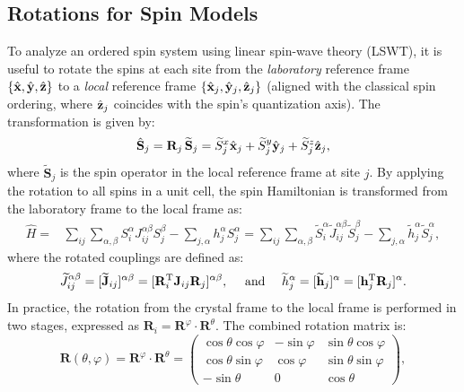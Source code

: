 \subsection{Rotations for Spin Models}
To analyze an ordered spin system using linear spin-wave theory (LSWT), it is useful to rotate the spins at each site from the \emph{laboratory} reference frame $\{\hat{\bf x}, \hat{\bf y}, \hat{\bf z}\}$ to a \emph{local} reference frame $\{\hat{\bf x}_{j}, \hat{\bf y}_{j}, \hat{\bf z}_{j}\}$ (aligned with the classical spin ordering, where $\hat{{\bf z}}_{j}$ coincides with the spin's quantization axis). 
The transformation is given by:
\begin{equation}
    \label{eq: Spin rotation}
    \hat{\bf S}_j = \mathbf{R}_j \, \widetilde{\mathbf{S}}_j 
    = \widetilde{S}^{x}_{j} \hat{\bf x}_{j} + \widetilde{S}^{y}_{j} \hat{\bf y}_{j} + \widetilde{S}^{z}_{j} \hat{\bf z}_{j},
\end{equation}
where $\widetilde{\mathbf{S}}_j$ is the spin operator in the local reference frame at site $j$.
By applying the rotation to all spins in a unit cell, the spin Hamiltonian is transformed from the laboratory frame to the local frame as:
\begin{equation}\label{eq: Rotated Hamiltonian}
    \begin{split}
        \hat{H} = & \sum_{ij} \sum_{\alpha, \beta} S^{\alpha}_{i} J_{ij}^{\alpha\beta} S^{\beta}_{j} - \sum_{j, \alpha} h_{j}^{\alpha} S^{\alpha}_{j}
        = \sum_{ij} \sum_{\alpha, \beta} \widetilde{S}^{\alpha}_{i} \widetilde{J}_{ij}^{\alpha\beta} \widetilde{S}^{\beta}_{j} - \sum_{j, \alpha} \widetilde{h}_{j}^{\alpha} \widetilde{S}^{\alpha}_{j},
    \end{split}
\end{equation}
where the rotated couplings are defined as:
\begin{equation}
    \widetilde{J}_{ij}^{\alpha\beta}  = [\widetilde{\mathbf{J}}_{ij}]^{\alpha\beta} = [\mathbf{R}_i^{\rm T} \mathbf{J}_{ij} \mathbf{R}_j]^{\alpha\beta}, 
    \quad \text{ and } \quad
     \widetilde{h}_{j}^{\alpha} = [\widetilde{\mathbf{h}}_j]^{\alpha} = [\mathbf{h}_{j}^{\rm T} \mathbf{R}_{j}]^{\alpha}.
\end{equation}
In practice, the rotation from the crystal frame to the local frame is performed in two stages, expressed as $\mathbf{R}_i = \mathbf{R}^{\varphi} \cdot \mathbf{R}^{\theta}$. The combined rotation matrix is:
\begin{equation}
    \mathbf{R} (\theta, \varphi) = \mathbf{R}^{\varphi} \cdot \mathbf{R}^{\theta} = 
    \begin{pmatrix} 
        \cos \theta \cos \varphi & -\sin \varphi & \sin \theta \cos \varphi \\
        \cos \theta \sin \varphi & \cos \varphi & \sin \theta \sin \varphi \\
        -\sin \theta & 0 & \cos \theta
    \end{pmatrix},
    \label{eq_frametransform_gen}
\end{equation}
